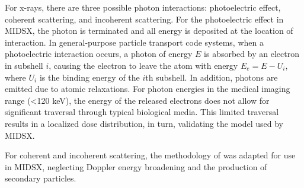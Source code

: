 \par For x-rays, there are three possible photon interactions: photoelectric effect, coherent scattering, and incoherent scattering. For the photoelectric effect in MIDSX, the photon is terminated and all energy is deposited at the location of interaction. In general-purpose particle transport code systems, when a photoelectric interaction occurs, a photon of energy $E$ is absorbed by an electron in subshell $i$, causing the electron to leave the atom with energy $E_e = E - U_i$, where $U_i$ is the binding energy of the $i$th subshell. In addition, photons are emitted due to atomic relaxations. For photon energies in the medical imaging range (<120 keV), the energy of the released electrons does not allow for significant traversal through typical biological media. This limited traversal results in a localized dose distribution, in turn, validating the model used by MIDSX.

\par For coherent and incoherent scattering, the methodology of \cite{lund2018implementation} was adapted for use in MIDSX, neglecting Doppler energy broadening and the production of secondary particles.




